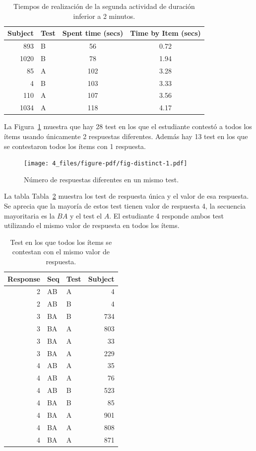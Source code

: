 \documentclass[
  12pt,
  a4paper,
  extrafontsizes,
  onecolumn,
  openright,
  table]{memoir}
\begin{document}
\hypertarget{tbl-washout}{}
\begin{longtable}{rlcc}
\caption{\label{tbl-washout}Tiempos de realización de la segunda actividad de duración inferior a 2
minutos. }\tabularnewline

\toprule
Subject & Test & Spent time (secs) & Time by Item (secs) \\ 
\midrule
893 & B & 56 & 0.72 \\ 
1020 & B & 78 & 1.94 \\ 
85 & A & 102 & 3.28 \\ 
4 & B & 103 & 3.33 \\ 
110 & A & 107 & 3.56 \\ 
1034 & A & 118 & 4.17 \\ 
\bottomrule
\end{longtable}

La Figura~\ref{fig-distinct} muestra que hay 28 test en los que el
estudiante contestó a todos los ítems usando únicamente 2 respuestas
diferentes. Además hay 13 test en los que se contestaron todos los ítems
con 1 respuesta.

\begin{figure}[h]

{\centering \texttt{[image: 4\_files/figure-pdf/fig-distinct-1.pdf]}

}

\caption{\label{fig-distinct}Número de respuestas diferentes en un mismo
test.}

\end{figure}

La tabla Tabla~\ref{tbl-distinct2} muestra los test de respuesta única y
el valor de esa respuesta. Se aprecia que la mayoría de estos test
tienen valor de respuesta 4, la secuencia mayoritaria es la \(BA\) y el
test el \(A\). El estudiante 4 responde ambos test utilizando el mismo
valor de respuesta en todos los ítems.

\clearpage

\hypertarget{tbl-distinct2}{}
\begin{longtable}{rllr}
\caption{\label{tbl-distinct2}Test en los que todos los ítems se contestan con el mismo valor de
respuesta. }\tabularnewline

\toprule
Response & Seq & Test & Subject \\ 
\midrule
2 & AB & A & 4 \\ 
2 & AB & B & 4 \\ 
3 & BA & B & 734 \\ 
3 & BA & A & 803 \\ 
3 & BA & A & 33 \\ 
3 & BA & A & 229 \\ 
4 & AB & A & 35 \\ 
4 & AB & A & 76 \\ 
4 & AB & B & 523 \\ 
4 & BA & B & 85 \\ 
4 & BA & A & 901 \\ 
4 & BA & A & 808 \\ 
4 & BA & A & 871 \\ 
\bottomrule
\end{longtable}
\end{document}
